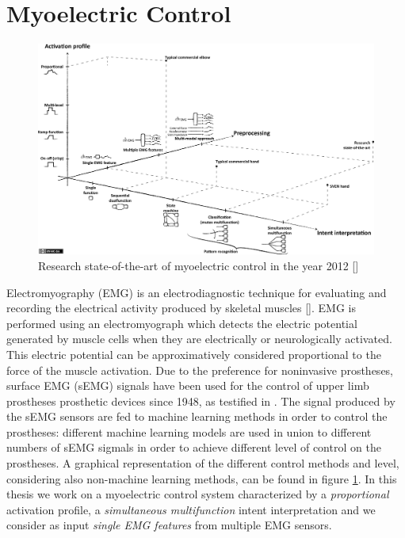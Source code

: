 \section{Myoelectric Control}\label{sec:EMG}
\begin{figure}[ht]
    \centering
    \includegraphics[width=1\textwidth]{Images/myoelectric-control.png}
    \caption{Research state-of-the-art of myoelectric control in the year 2012 [\cite{Fougner2012ControlOU}]}
    \label{fig:myo-control-schema}
\end{figure}
Electromyography (EMG) is an electrodiagnostic technique for evaluating and recording the electrical activity produced by skeletal muscles [\cite{0736093400}]. EMG is performed using an electromyograph which detects the electric potential generated by muscle cells when they are electrically or neurologically activated.
This electric potential can be approximatively considered proportional to the force of the muscle activation.
Due to the preference for noninvasive prostheses, surface EMG (sEMG) signals have been used for the control of upper limb prostheses prosthetic devices since 1948, as testified in \cite{Zecca2002}.
The signal produced by the sEMG sensors are fed to machine learning methods in order to control the prostheses: different machine learning models are used in union to different numbers of sEMG sigmals in order to achieve different level of control on the prostheses. A graphical representation of the different control methods and level, considering also non-machine learning methods, can be found in figure \ref{fig:myo-control-schema}.
In this thesis we work on a myoelectric control system characterized by a \textit{proportional} activation profile, a \textit{simultaneous multifunction} intent interpretation and we consider as input \textit{single EMG features} from multiple EMG sensors.